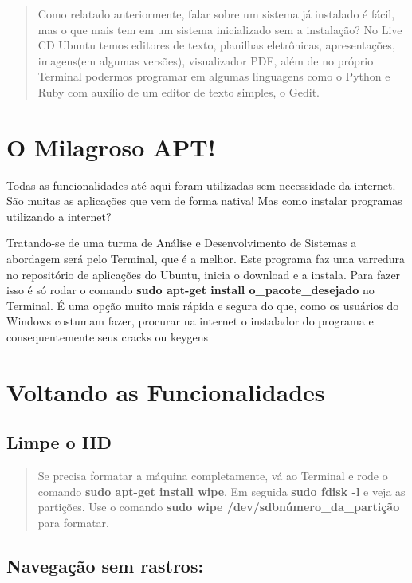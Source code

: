 \documentclass[12pt, a4paper, tocpage=plain]{abnt} %
\begin{document}
\begin{quote}
Como relatado anteriormente, falar sobre um sistema já instalado é fácil, mas o que mais tem em um sistema inicializado sem a instalação? No Live CD Ubuntu temos editores de texto, planilhas eletrônicas, apresentações, imagens(em algumas versões), visualizador PDF, além de no próprio Terminal podermos programar em algumas linguagens como o Python e Ruby com auxílio de um editor de texto simples, o Gedit.
\end{quote}

\chapter{O Milagroso APT!}

Todas as funcionalidades até aqui foram utilizadas sem necessidade da internet. São muitas as aplicações que vem de forma nativa! Mas como instalar programas utilizando a internet?

Tratando-se de uma turma de Análise e Desenvolvimento de Sistemas a abordagem será pelo Terminal, que é a melhor. Este programa faz uma varredura no repositório de aplicações do Ubuntu, inicia o download e a instala. Para fazer isso é só rodar o comando {\bf sudo apt-get install o\_pacote\_desejado} no Terminal. É uma opção muito mais rápida e segura do que, como os usuários do Windows costumam fazer, procurar na internet o instalador do programa e consequentemente seus cracks ou keygens

\chapter{Voltando as Funcionalidades}

\section{Limpe o HD}

\begin{quote}
Se precisa formatar a máquina completamente, vá ao Terminal e rode o comando {\bf sudo apt-get install wipe}. Em seguida {\bf sudo fdisk -l} e veja as partições. Use o comando {\bf sudo wipe /dev/sdbnúmero\_da\_partição} para formatar.
\end{quote}

\section{Navegação sem rastros:}
\end{document}
